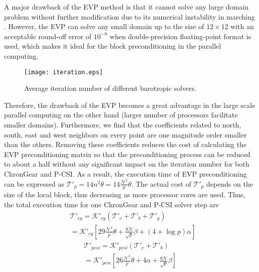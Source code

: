 A major drawback of the EVP method is that it cannot solve any large domain problem without further modification due to
its numerical instability in marching \cite{roache1995elliptic}. 
However, the EVP can solve any small domain up to the size of $12\times 12$ with
an acceptable round-off error of $10^{-8}$ when double-precision floating-point format is used, which makes it ideal for the block preconditioning
in the parallel computing.
\begin {figure}[!t]
\centering
\texttt{[image: iteration.eps]}
\caption[] {Average iteration number of different barotropic solvers. \label{fig:iteration}}
\end{figure}


Therefore, the drawback of the EVP becomes a great advantage in the large scale parallel computing on the other hand
(larger number of processors facilitate smaller domains).
Furthermore, we find that the coefficients related to north, south, east and west neighbors on every point are one magnitude order smaller than the others. 
Removing these coefficients reduces the cost of calculating the EVP preconditioning matrix so that the preconditioning process
can be reduced to about a half without any significant impact on the iteration number for both ChronGear and P-CSI. 
As a result, the execution time of EVP preconditioning can be expressed as $\mathcal{T'}_{p} = 14n^2\theta= 14\frac{\mathcal{N}^2}{p}\theta$. 
The actual cost of $\mathcal{T'}_{p}$ depends on the size of the local block, thus decreasing as more processor cores are used.
Thus, the total execution time for one ChronGear and P-CSI solver step are 
\begin{eqnarray}
\label{t_evppcg}
&\mathcal{T'}_{cg}=\mathcal{K'}_{cg} (\mathcal{T'}_c + \mathcal{T'}_b+\mathcal{T'}_g )\nonumber \\
&=\mathcal{K'}_{cg} [29 \frac{\mathcal{N}^2}{p}\theta + \frac{8\mathcal{N}}{\sqrt{p}}\beta +(4+\log p)\alpha]
\end{eqnarray}
\begin{eqnarray}
\label{t_evppsi}
\mathcal{T'}_{pcsi} = \mathcal{K'}_{pcsi}(\mathcal{T'}_c + \mathcal{T'}_b ) \nonumber \\
= \mathcal{K'}_{pcsi}[26\frac{\mathcal{N}^2}{p}\theta+ 4\alpha + \frac{8\mathcal{N}}{ \sqrt{p}}\beta]
\end{eqnarray}


